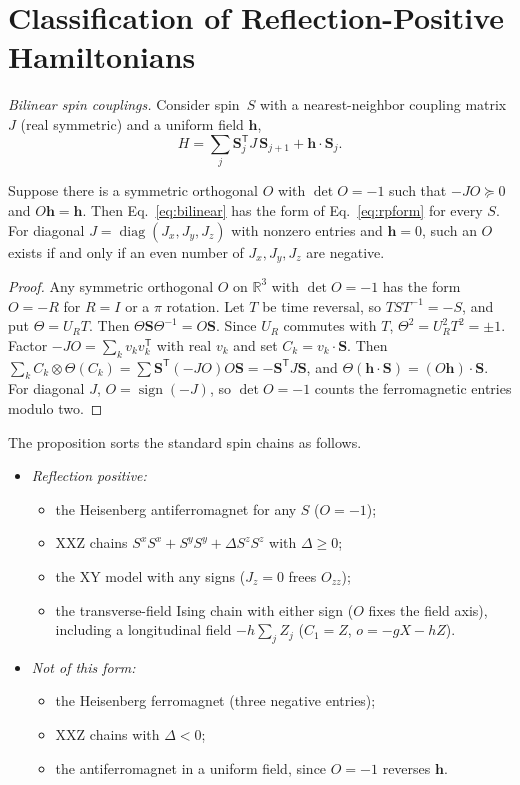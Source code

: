 \documentclass[aps,prl,reprint,amsmath,amssymb,nofootinbib,raggedbottom]{revtex4-2}
\begin{document}
\section{Classification of Reflection-Positive Hamiltonians}\label{app:catalogue}
\emph{Bilinear spin couplings.} Consider spin~$S$ with a nearest-neighbor
coupling matrix $J$ (real symmetric) and a uniform field $\bm h$,
\begin{equation}
 H=\sum_j\bm S_j^{\mathsf T}J\,\bm S_{j+1}+\bm h\cdot\bm S_j .
 \label{eq:bilinear}
\end{equation}
\begin{proposition}\label{prop:xyz}
Suppose there is a symmetric orthogonal $O$ with $\det O=-1$ such that
$-JO\succeq0$ and $O\bm h=\bm h$. Then Eq.~\eqref{eq:bilinear} has the form
of Eq.~\eqref{eq:rpform} for every $S$. For diagonal
$J=\operatorname{diag}(J_x,J_y,J_z)$ with nonzero entries and $\bm h=0$, such
an $O$ exists if and only if an even number of $J_x,J_y,J_z$ are negative.
\end{proposition}
\begin{proof}
Any symmetric orthogonal $O$ on $\mathbb R^3$ with $\det O=-1$ has the form
$O=-R$ for $R=I$ or a $\pi$ rotation. Let $T$ be time reversal,
so $TST^{-1}=-S$, and put $\Theta=U_RT$. Then $\Theta\bm S\Theta^{-1}=O\bm S$.
Since $U_R$ commutes with $T$, $\Theta^2=U_R^2T^2=\pm1$. Factor
$-JO=\sum_kv_kv_k^{\mathsf T}$ with real $v_k$ and set
$C_k=v_k\cdot\bm S$. Then
$\sum_kC_k\otimes\Theta(C_k)=\sum\bm S^{\mathsf T}(-JO)O\bm S
=-\bm S^{\mathsf T}J\bm S$, and $\Theta(\bm h\cdot\bm S)=(O\bm h)\cdot\bm S$.
For diagonal $J$, $O=\operatorname{sign}(-J)$, so $\det O=-1$ counts the
ferromagnetic entries modulo two.
\end{proof}
\noindent The proposition sorts the standard spin chains as follows.
\begin{itemize}
\item \emph{Reflection positive:}
 \begin{itemize}
 \item the Heisenberg antiferromagnet for any $S$ ($O=-1$);
 \item XXZ chains $S^xS^x+S^yS^y+\Delta S^zS^z$ with $\Delta\ge0$;
 \item the XY model with any signs ($J_z=0$ frees $O_{zz}$);
 \item the transverse-field Ising chain with either sign ($O$ fixes the field
 axis), including a longitudinal field $-h\sum_j Z_j$ ($C_1=Z$, $o=-gX-hZ$).
 \end{itemize}
\item \emph{Not of this form:}
 \begin{itemize}
 \item the Heisenberg ferromagnet (three negative entries);
 \item XXZ chains with $\Delta<0$;
 \item the antiferromagnet in a uniform field, since $O=-1$ reverses $\bm h$.
 \end{itemize}
\end{itemize}
\end{document}
